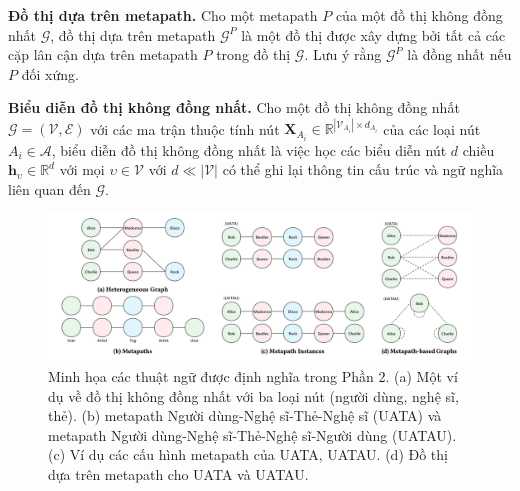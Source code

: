 \begin{definition}
  \textbf{Đồ thị dựa trên metapath.} Cho một metapath $P$ của một đồ thị không đồng nhất $\pmb{\mathcal{G}}$, đồ thị dựa trên metapath $\pmb{\mathcal{G}}^P$ là một đồ thị được xây dựng bởi tất cả các cặp lân cận dựa trên metapath $P$ trong đồ thị $\pmb{\mathcal{G}}$. Lưu ý rằng $\pmb{\mathcal{G}}^P$ là đồng nhất nếu $P$ đối xứng.
\end{definition}

\begin{definition}
  \textbf{Biểu diễn đồ thị không đồng nhất.} Cho một đồ thị không đồng nhất $\pmb{\mathcal{G}} = (\pmb{\mathcal{V}}, \pmb{\mathcal{E}})$ với các ma trận thuộc tính nút $\pmb{X}_{A_i} \in \mathbb{R} ^ {|\pmb{\mathcal{V}}_{A_i}| \times d_{A_i}}$ của các loại nút $A_i \in \pmb{\mathcal{A}}$, biểu diễn đồ thị không đồng nhất là việc học các biểu diễn nút $d$ chiều $\pmb{h}_{\upsilon} \in \mathbb{R}^d$ với mọi $\upsilon \in \pmb{\mathcal{V}}$ với $d \ll |\pmb{\mathcal{V}}|$ có thể ghi lại thông tin cấu trúc và ngữ nghĩa liên quan đến $\pmb{\mathcal{G}}$.
\end{definition}

\begin{figure}
  \includegraphics[width=\textwidth]{figs/fig1.png}
  \caption{Minh họa các thuật ngữ được định nghĩa trong Phần 2. (a) Một ví dụ về đồ thị không đồng nhất với ba loại nút (người dùng, nghệ sĩ, thẻ). (b) metapath Người dùng-Nghệ sĩ-Thẻ-Nghệ sĩ (UATA) và metapath Người dùng-Nghệ sĩ-Thẻ-Nghệ sĩ-Người dùng (UATAU). (c) Ví dụ các cấu hình metapath của UATA, UATAU. (d) Đồ thị dựa trên metapath cho UATA và UATAU.}
\end{figure}



